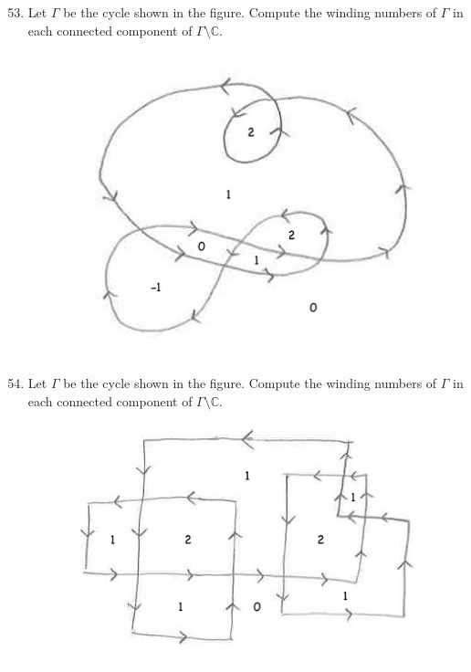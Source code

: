 \documentclass[10pt]{article}
\newcommand{\C}{\mathbb{C}}
\begin{document}
\begin{enumerate}
\setcounter{enumi}{52}

\item Let $\Gamma$ be the cycle shown in the figure.  Compute the winding numbers of $\Gamma$ in each connected component of $\Gamma \setminus \C$.
\begin{figure}[ht!]
\centering
\includegraphics[width=120mm]{winding1.jpg}
\end{figure}

\item Let $\Gamma$ be the cycle shown in the figure.  Compute the winding numbers of $\Gamma$ in each connected component of $\Gamma \setminus \C$.
\begin{figure}[ht!]
\centering
\includegraphics[width=120mm]{winding2.jpg}
\end{figure}


\end{enumerate}
\end{document}
